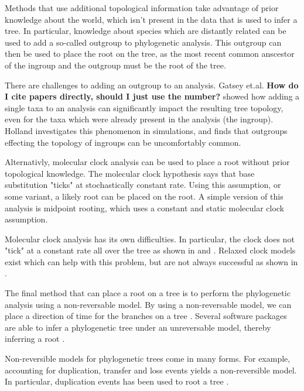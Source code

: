 \documentclass{article}
\newcommand{\BenComment}[1]{{\bf \color{blue} {#1}}}
\begin{document}
Methods that use additional topological information take advantage of prior
knowledge about the world, which isn't present in the data that is used to infer
a tree. In particular, knowledge about species which are distantly related can
be used to add a so-called outgroup to phylogenetic analysis. This outgroup can
then be used to place the root on the tree, as the most recent common anscestor
of the ingroup and the outgroup must be the root of the tree.

There are challenges to adding an outgroup to an analysis. Gatsey et.al.
\cite{gatesy_how_2007} \BenComment{How do I cite papers directly, should I just
  use the number?} showed how adding a single taxa to an analysis can
significantly impact the resulting tree topology, even for the taxa which were
already present in the analysis (the ingroup). Holland
\cite{holland_outgroup_2003} investigates this phenomenon in simulations, and
finds that outgroups effecting the topology of ingroups can be uncomfortably
common.

Alternativly, molecular clock analysis can be used to place a root without prior
topological knowledge\cite{yang_computational_2006}. The molecular clock
hypothesis says that base substitution "ticks" at stochastically constant rate.
Using this assumption, or some variant, a likely root can be placed on the root.
A simple version of this analysis is midpoint rooting, which uses a constant and
static molecular clock assumption.

Molecular clock analysis has its own difficulties. In particular, the clock
does not "tick" at a constant rate all over the tree as shown in
\cite{steiper_primate_2006} and \cite{li_molecular_1987}. Relaxed clock models
exist which can help with this problem, but are not always successful as shown
in \cite{battistuzzi_performance_2010}.

The final method that can place a root on a tree is to perform the phylogenetic
analysis using a non-reversable model. By using a non-reversable model, we can
place a direction of time for the branches on a tree
\cite{yap_rooting_2005}. Several software packages are able to infer a
phylogenetic tree under an unreversable model, thereby inferring a root
\cite{nguyen_iq-tree:_2015} \cite{ronquist_mrbayes_2003}.

Non-reversible models for phylogenetic trees come in many forms. For example,
accounting for duplication, transfer and loss events yields a non-reversible
model. In particular, duplication events has been used to root a tree
\cite{emms_stride:_2017}.
\end{document}

